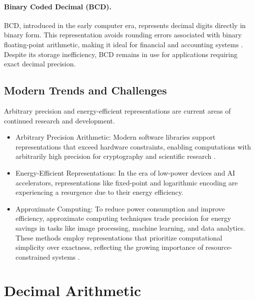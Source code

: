 \paragraph{Binary Coded Decimal (BCD).}
BCD, introduced in the early computer era, represents decimal digits directly in binary form. This representation avoids rounding errors associated with binary floating-point arithmetic, making it ideal for financial and accounting systems \cite{randell1982origins}. Despite its storage inefficiency, BCD remains in use for applications requiring exact decimal precision.

\subsection{Modern Trends and Challenges}
Arbitrary precision and energy-efficient representations are current areas of continued research and development.

\begin{itemize}
    \item Arbitrary Precision Arithmetic: Modern software libraries support representations that exceed hardware constraints, enabling computations with arbitrarily high precision for cryptography and scientific research \cite{smith1997science}.
    \item Energy-Efficient Representations: In the era of low-power devices and AI accelerators, representations like fixed-point and logarithmic encoding are experiencing a resurgence due to their energy efficiency.
    \item Approximate Computing: To reduce power consumption and improve efficiency, approximate computing techniques trade precision for energy savings in tasks like image processing, machine learning, and data analytics. These methods employ representations that prioritize computational simplicity over exactness, reflecting the growing importance of resource-constrained systems \cite{han2013approximate}.
\end{itemize}

\section{Decimal Arithmetic}


